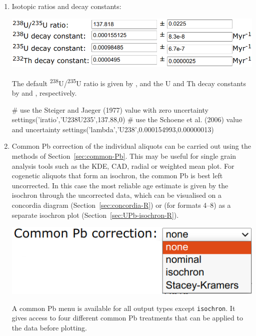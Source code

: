 \begin{refsection}
\begin{enumerate}
  \item\label{it:UPbLambdairatio} Isotopic ratios and decay constants:

\noindent\begin{minipage}[t]{.6\linewidth}
\strut\vspace*{-\baselineskip}\newline
\includegraphics[width=\linewidth]{../figures/UPbLambda.png}
\end{minipage}
\begin{minipage}[t]{.4\linewidth}
  The default \textsuperscript{238}U/\textsuperscript{235}U ratio is
  given by \citet{hiess2012}, and the U and Th decay constants by
  \citet{jaffey1971} and \citet{leroux1963}, respectively.
\end{minipage}

\begin{script}
# use the Steiger and Jaeger (1977) value with zero uncertainty
settings('iratio','U238U235',137.88,0)
# use the Schoene et al. (2006) value and uncertainty
settings('lambda','U238',0.000154993,0.00000013) 
\end{script}

\item\label{it:common-Pb-concordia} Common Pb correction of the
  individual aliquots can be carried out using the methods of
  Section~\ref{sec:common-Pb}. This may be useful for single grain
  analysis tools such as the KDE, CAD, radial or weighted mean
  plot. For cogenetic aliquots that form an isochron, the common Pb is
  best left uncorrected. In this case the most reliable age estimate
  is given by the isochron through the uncorrected data, which can be
  visualised on a concordia diagram (Section~\ref{sec:concordia-R}) or
  (for formats 4--8) as a separate isochron plot
  (Section~\ref{sec:UPb-isochron-R}).

\noindent\begin{minipage}[t]{.4\linewidth}
\strut\vspace*{-\baselineskip}\newline
\includegraphics[width=\linewidth]{../figures/CommonPb.png}
\end{minipage}
\begin{minipage}[t]{.6\linewidth}
  A common Pb menu is available for all output types except
  \texttt{isochron}. It gives access to four different common Pb
  treatments that can be applied to the data before plotting.
\end{minipage}


\end{enumerate}
\end{refsection}
